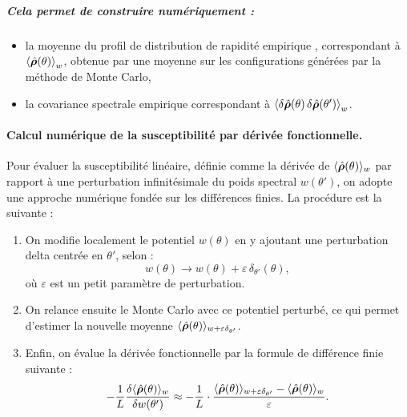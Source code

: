 \subparagraph{Cela permet de construire numériquement :}

\begin{itemize}[label = $\bullet$]
    \item la moyenne du profil de distribution de rapidité empirique , correspondant à \( \braket{ \hat{\bm{\rho}}(\theta) }_w \), obtenue par une moyenne sur les configurations générées par la méthode de Monte Carlo,
    \item la covariance spectrale empirique correspondant à \( \braket{ \delta \hat{\bm{\rho}}(\theta) \, \delta \hat{\bm{\rho}}(\theta') }_w \).
\end{itemize}

\paragraph{Calcul numérique de la susceptibilité par dérivée fonctionnelle.}

Pour évaluer la susceptibilité linéaire, définie comme la dérivée de \( \langle \hat{\bm{\rho}}(\theta) \rangle_w \) par rapport à une perturbation infinitésimale du poids spectral \( w(\theta') \), on adopte une approche numérique fondée sur les différences finies. La procédure est la suivante :
\begin{enumerate}
    \item On modifie localement le potentiel \( w(\theta) \) en y ajoutant une perturbation delta centrée en \( \theta' \), selon :
    \begin{equation}
    	w(\theta) \rightarrow w(\theta) + \varepsilon\, \delta_{\theta'}(\theta),
   	\end{equation}
    où \( \varepsilon \) est un petit paramètre de perturbation.
    
    \item On relance ensuite le Monte Carlo avec ce potentiel perturbé, ce qui permet d’estimer la nouvelle moyenne \( \langle \hat{\bm{\rho}}(\theta) \rangle_{w + \varepsilon \delta_{\theta'}} \).
    
    \item Enfin, on évalue la dérivée fonctionnelle par la formule de différence finie suivante :
    \begin{equation}
    	-\frac{1}{L} \frac{\delta \langle\hat{\bm{\rho}} (\theta) \rangle_w }{\delta w(\theta') }  \approx -\frac{1}{L} \cdot \frac{ \langle \hat{\bm{\rho}}(\theta) \rangle_{w + \varepsilon \delta_{\theta'}} -  \langle\hat{\bm{\rho}} (\theta) \rangle_w }{ \varepsilon }.
    \end{equation}
\end{enumerate}


